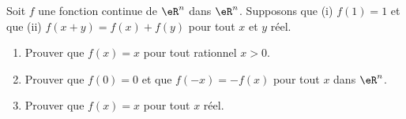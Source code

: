 
\begin{exercice}\label{exo0034}

Soit $f$ une fonction continue de $\eR^n$ dans $\eR^n$. Supposons que (i) $f(1)=1$ et que (ii) $f(x+y)=f(x)+f(y)$ pour tout $x$ et $y$ réel.
\begin{enumerate}
	\item Prouver que $f(x)=x$ pour tout rationnel $x>0$.
	\item Prouver que $f(0)=0$ et que $f(-x)=-f(x)$ pour tout $x$ dans $\eR^n$.
	\item Prouver que $f(x)=x$ pour tout $x$ réel.
\end{enumerate}

\end{exercice}
